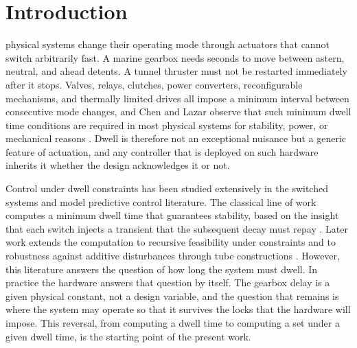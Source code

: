 \documentclass[journal]{IEEEtran}
\begin{document}
\section{Introduction}\label{sec_intro}

 physical systems change their operating mode through actuators that cannot switch arbitrarily fast. A marine gearbox needs seconds to move between astern, neutral, and ahead detents. A tunnel thruster must not be restarted immediately after it stops. Valves, relays, clutches, power converters, reconfigurable mechanisms, and thermally limited drives all impose a minimum interval between consecutive mode changes, and Chen and Lazar observe that such minimum dwell time conditions are required in most physical systems for stability, power, or mechanical reasons \cite{chenlazar2022}. Dwell is therefore not an exceptional nuisance but a generic feature of actuation, and any controller that is deployed on such hardware inherits it whether the design acknowledges it or not.

Control under dwell constraints has been studied extensively in the switched systems and model predictive control literature. The classical line of work computes a minimum dwell time that guarantees stability, based on the insight that each switch injects a transient that the subsequent decay must repay \cite{hespanha1999,vicente2019}. Later work extends the computation to recursive feasibility under constraints \cite{zhang2016,zhuang2023} and to robustness against additive disturbances through tube constructions \cite{zhang2016,vicente2019,lavaei2021}. However, this literature answers the question of how long the system must dwell. In practice the hardware answers that question by itself. The gearbox delay is a given physical constant, not a design variable, and the question that remains is where the system may operate so that it survives the locks that the hardware will impose. This reversal, from computing a dwell time to computing a set under a given dwell time, is the starting point of the present work.
\end{document}
